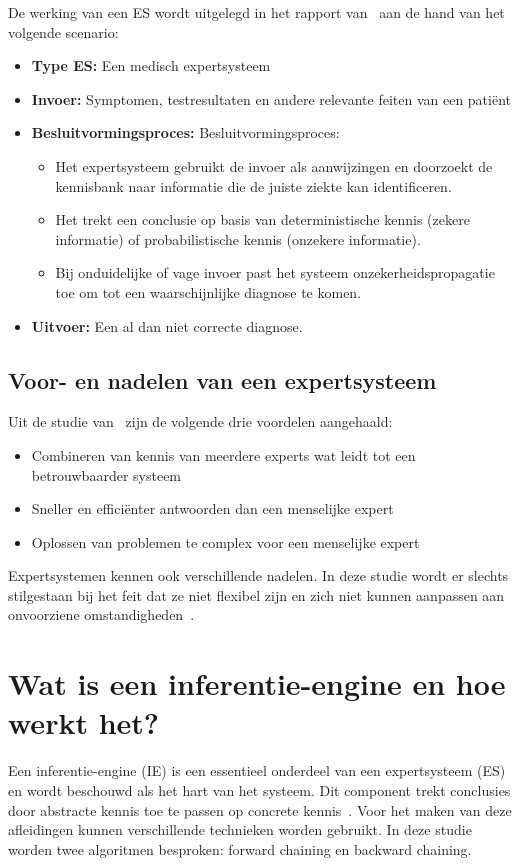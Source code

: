De werking van een ES wordt uitgelegd in het rapport van~\textcite{Castillo2012} aan de hand van het volgende scenario:
\begin{itemize}
    \item \textbf{Type ES:} Een medisch expertsysteem
    \item \textbf{Invoer:} Symptomen, testresultaten en andere relevante feiten van een patiënt
    \item \textbf{Besluitvormingsproces:}
    {Besluitvormingsproces:}
    \begin{itemize}
        \item Het expertsysteem gebruikt de invoer als aanwijzingen en doorzoekt de kennisbank naar informatie die de juiste ziekte kan identificeren.
        \item Het trekt een conclusie op basis van deterministische kennis (zekere informatie) of probabilistische kennis (onzekere informatie).
        \item Bij onduidelijke of vage invoer past het systeem onzekerheidspropagatie toe om tot een waarschijnlijke diagnose te komen.
        \end{itemize}
    \item \textbf{Uitvoer:} Een al dan niet correcte diagnose.
\end{itemize}

\subsection{Voor- en nadelen van een expertsysteem}
Uit de studie van~\textcite{Castillo2012} zijn de volgende drie voordelen aangehaald:
\begin{itemize}
    \item {Combineren van kennis van meerdere experts wat leidt tot een betrouwbaarder systeem}
    \item {Sneller en efficiënter antwoorden dan een menselijke expert}
    \item {Oplossen van problemen te complex voor een menselijke expert}
\end{itemize}

Expertsystemen kennen ook verschillende nadelen. In deze studie wordt er slechts stilgestaan bij het feit dat ze niet flexibel zijn en zich niet kunnen aanpassen aan onvoorziene omstandigheden~\autocite{Turban1988}.

\section{Wat is een inferentie-engine en hoe werkt het?}
Een inferentie-engine (IE) is een essentieel onderdeel van een expertsysteem (ES) en wordt beschouwd als het hart van het systeem. Dit component trekt conclusies door abstracte kennis toe te passen op concrete kennis~\autocite{Castillo2012}. Voor het maken van deze afleidingen kunnen verschillende technieken worden gebruikt. In deze studie worden twee algoritmen besproken: forward chaining en backward chaining.

